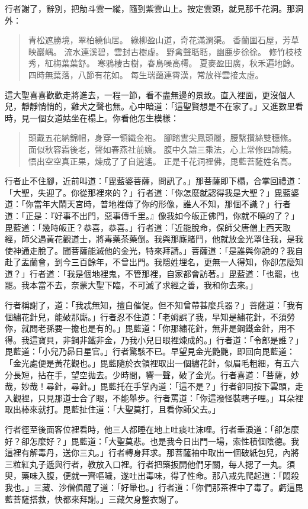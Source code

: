 行者謝了，辭別，把觔斗雲一縱，隨到紫雲山上。按定雲頭，就見那千花洞。那洞外：
\begin{quote}
青松遮勝境，翠柏繞仙居。
綠柳盈山道，奇花滿澗渠。
香蘭圍石屋，芳草映巖嵎。
流水連溪碧，雲封古樹虛。
野禽聲聒聒，幽鹿步徐徐。
修竹枝枝秀，紅梅葉葉舒。
寒鴉棲古樹，春鳥噪高樗。
夏麥盈田廣，秋禾遍地餘。
四時無葉落，八節有花如。
每生瑞藹連霄漢，常放祥雲接太虛。
\end{quote}

這大聖喜喜歡歡走將進去，一程一節，看不盡無邊的景致。直入裡面，更沒個人兒，靜靜悄悄的，雞犬之聲也無。心中暗道：「這聖賢想是不在家了。」又進數里看時，見一個女道姑坐在榻上。你看他怎生模樣：
\begin{quote}
頭戴五花納錦帽，身穿一領織金袍。
腳踏雲尖鳳頭履，腰繫攢絲雙穗絛。
面似秋容霜後老，聲如春燕社前嬌。
腹中久諳三乘法，心上常修四諦饒。
悟出空空真正果，煉成了了自逍遙。
正是千花洞裡佛，毘藍菩薩姓名高。
\end{quote}

行者止不住腳，近前叫道：「毘藍婆菩薩，問訊了。」那菩薩即下榻，合掌回禮道：「大聖，失迎了。你從那裡來的？」行者道：「你怎麼就認得我是大聖？」毘藍婆道：「你當年大鬧天宮時，普地裡傳了你的形像，誰人不知，那個不識？」行者道：「正是：『好事不出門，惡事傳千里。』像我如今皈正佛門，你就不曉的了？」毘藍道：「幾時皈正？恭喜，恭喜。」行者道：「近能脫命，保師父唐僧上西天取經，師父遇黃花觀道士，將毒藥茶藥倒。我與那廝賭鬥，他就放金光罩住我，是我使神通走脫了。聞菩薩能滅他的金光，特來拜請。」菩薩道：「是誰與你說的？我自赴了盂蘭會，到今三百餘年，不曾出門。我隱姓埋名，更無一人得知，你卻怎麼知道？」行者道：「我是個地裡鬼，不管那裡，自家都會訪著。」毘藍道：「也罷，也罷。我本當不去，奈蒙大聖下臨，不可滅了求經之善，我和你去來。」

行者稱謝了，道：「我忒無知，擅自催促。但不知曾帶甚麼兵器？」菩薩道：「我有個繡花針兒，能破那廝。」行者忍不住道：「老姆誤了我，早知是繡花針，不須勞你，就問老孫要一擔也是有的。」毘藍道：「你那繡花針，無非是鋼鐵金針，用不得。我這寶貝，非鋼非鐵非金，乃我小兒日眼裡煉成的。」行者道：「令郎是誰？」毘藍道：「小兒乃昴日星官。」行者驚駭不已。早望見金光艷艷，即回向毘藍道：「金光處便是黃花觀也。」毘藍隨於衣領裡取出一個繡花針，似眉毛粗細，有五六分長短，拈在手，望空拋去。少時間，響一聲，破了金光。行者喜道：「菩薩，妙哉，妙哉！尋針，尋針。」毘藍托在手掌內道：「這不是？」行者卻同按下雲頭，走入觀裡，只見那道士合了眼，不能舉步。行者罵道：「你這潑怪裝瞎子哩。」耳朵裡取出棒來就打。毘藍扯住道：「大聖莫打，且看你師父去。」

行者徑至後面客位裡看時，他三人都睡在地上吐痰吐沫哩。行者垂淚道：「卻怎麼好？卻怎麼好？」毘藍道：「大聖莫悲。也是我今日出門一場，索性積個陰德。我這裡有解毒丹，送你三丸。」行者轉身拜求。那菩薩袖中取出一個破紙包兒，內將三粒紅丸子遞與行者，教放入口裡。行者把藥扳開他們牙關，每人揌了一丸。須臾，藥味入腹，便就一齊嘔噦，遂吐出毒味，得了性命。那八戒先爬起道：「悶殺我也。」三藏、沙僧俱醒了道：「好暈也。」行者道：「你們那茶裡中了毒了。虧這毘藍菩薩搭救，快都來拜謝。」三藏欠身整衣謝了。


